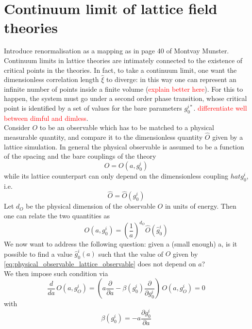 \section{Continuum limit of lattice field theories}
\label{sec:continuum_limit}
Introduce renormalisation as a mapping as in page 40 of Montvay Munster. \\
Continuum limits in lattice theories are intimately connected to the existence of critical points in the theories. In fact, to take a continuum limit, one want the dimensionless correlation length $\hat \xi$ to diverge: in this way one can represent an infinite number of points inside a finite volume (\textcolor{red}{explain better here}). For this to happen, the system must go under a second order phase transition, whose critical point is identified by a set of values for the bare parameters $g_0^{i*}$. \textcolor{red}{differentiate well between dimful and dimless}. \\
Consider $O$ to be an observable which has to be matched to a physical measurable quantity, and compare it to the dimensionless quantity $\hat O$ given by a lattice simulation. In general the physical observable is assumed to be a function of the spacing and the bare couplings of the theory 
\begin{equation*}
    O = O(a, g^i_0)
\end{equation*}
while its lattice counterpart can only depend on the dimensionless coupling $hat g_0^i$, i.e.
\begin{equation*}
    \hat O = \hat O(g_0^i)
\end{equation*}
Let $d_O$ be the physical dimension of the observable $O$ in units of energy. Then one can relate the two quantities as 
\begin{equation}
    O(a, g^i_0) = \left(\frac{1}{a}\right)^{d_O} \hat O(\hat g_0^i)
    \label{eq:physical_observable_lattice_observable}
\end{equation}
We now want to address the following question: given a (small enough) a, is it possible to find a value $\hat g_0^i(a)$ such that the value of $O$ given by \eqref{eq:physical_observable_lattice_observable} does not depend on $a$? \\
We then impose such condition via 
\begin{equation*}
    \frac{d}{da} \, O(a, g^i_O) = \left(a\frac{\partial}{\partial a} - \beta(g_0^i) \frac{\partial}{\partial g_0^i}\right) \, O(a, g^i_O) = 0
\end{equation*}
with
\begin{equation*}
    \beta(g_0^i) = - a \frac{\partial g_0^i}{\partial a}
\end{equation*}
